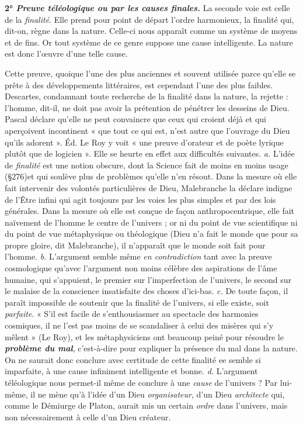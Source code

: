 {\textbf{2° \textit {\textsf{Preuve téléologique ou par les causes finales.}}}
La seconde voie est celle de
la {\it finalité}. Elle prend pour point de départ l’ordre harmonieux, la finalité
qui, dit-on, règne dans la nature. Celle-ci nous apparaît comme un système
de moyens et de fins. Or tout système de ce genre suppose une cause intelligente.
La nature est donc l’œuvre d’une telle cause.

Cette preuve, quoique l’une des plus anciennes et souvent utilisée parce
qu’elle se prête à des développements littéraires, est cependant l’une des
plus faibles. Descartes, condamnant toute recherche de la finalité dans
la nature, la rejette : l'homme, dit-il, ne doit pas avoir la prétention de
pénétrer les desseins de Dieu. Pascal déclare qu'elle ne peut convaincre
que ceux qui croient déjà et qui aperçoivent incontinent « que tout ce qui
est, n’est autre que l'ouvrage du Dieu qu'ils adorent ». Éd. Le Roy y
voit « une preuve d'orateur et de poète lyrique plutôt que de logicien ».
Elle se heurte en effet aux difficultés suivantes. {\it a.} L'idée de {\it finalité} est une
notion obscure, dont la Science fait de moins en moins usage (\S276)et qui
soulève plus de problèmes qu’elle n’en résout. Dans la mesure où elle fait
intervenir des volontés particulières de Dieu, Malebranche la déclare
indigne de l’Être infini qui agit toujours par les voies les plus simples et par
des lois générales. Dans la mesure où elle est conçue de façon anthropocentrique,
elle fait naïvement de l’homme le centre de l'univers ; or ni
du point de vue scientifique ni du point de vue métaphysique ou théologique
(Dieu n’a fait le monde que pour sa propre gloire, dit Malebranche),
il n'apparaît que le monde soit fait pour l'homme. {\it b.} L'argument semble
même {\it en contradiction} tant avec la preuve cosmologique qu'avec l'argument
non moins célèbre des aspirations de l’âme humaine, qui s'appuient, le
premier sur l’imperfection de l'univers, le second sur le malaise de la conscience
insatisfaite des choses d’ici-bas. {\it c.} De toute façon, il paraît impossible
de soutenir que la finalité de l'univers, si elle existe, soit {\it parfaite}. « S'il
est facile de s’enthousiasmer au spectacle des harmonies cosmiques, il ne
l'est pas moins de se scandaliser à celui des misères qui s’y mêlent » (Le Roy),
et les métaphysiciens ont beaucoup peiné pour résoudre le \textbf{\textit{\textsf{problème du mal}}},
c'est-à-dire pour expliquer la présence du mal dans la nature. On ne saurait
donc conclure avec certitude de cette finalité ee semble si imparfaite, à
une cause infiniment intelligente et bonne. {\it d.} L’argument téléologique
nous permet-il même de conclure à une {\it cause} de l'univers ? Par lui-même, il
ne mène qu’à l’idée d’un Dieu {\it organisateur}, d’un Dieu {\it architecte} qui, comme
le Démiurge de Platon, aurait mis un certain {\it ordre} dans l’univers, mais non
nécessairement à celle d’un Dieu créateur.}
\vspace{0.31cm}

